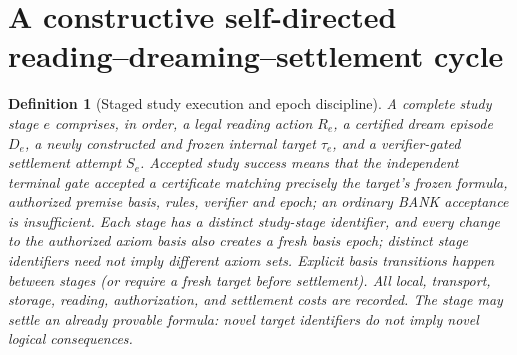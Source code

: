 \documentclass[11pt]{article}
\newtheorem{definition}[theorem]{Definition}
\begin{document}
\section{A constructive self-directed reading--dreaming--settlement cycle}
\begin{definition}[Staged study execution and epoch discipline]
A complete study stage $e$ comprises, in order, a legal reading action $R_e$, a certified dream episode $D_e$, a newly constructed and frozen internal target $\tau_e$, and a verifier-gated settlement attempt $S_e$. \emph{Accepted study success} means that the independent terminal gate accepted a certificate matching precisely the target's frozen formula, authorized premise basis, rules, verifier and epoch; an ordinary BANK acceptance is insufficient. Each stage has a distinct study-stage identifier, and every change to the authorized axiom basis also creates a fresh \emph{basis epoch}; distinct stage identifiers need not imply different axiom sets. Explicit basis transitions happen between stages (or require a fresh target before settlement). All local, transport, storage, reading, authorization, and settlement costs are recorded. The stage may settle an already provable formula: novel target identifiers do not imply novel logical consequences.
\end{definition}
\end{document}
